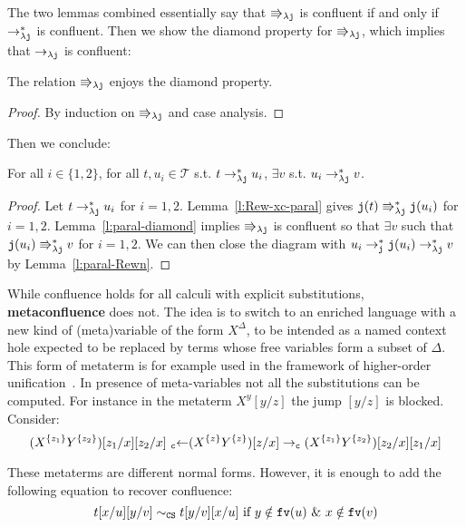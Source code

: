 \documentclass{LMCS}
\renewcommand{\>}{\rightarrow}
\def\lam{\lambda}
\newcommand{\Rew}[1]{\rightarrow_{#1}}
\newcommand{\Rewn}[2][*]{\rightarrow^{#1}_{#2}}
\newcommand{\dis}{{\tt j}}
\newcommand{\ldis}{\lam{\dis}}
\newcommand{\LRew}[1]{\mbox{}_{#1}{\leftarrow} }
\newcommand{\fv}[1]{{\tt fv}(#1)}
\newcommand{\DSubs}{{\tt c}}
\newcommand{\CS}{{\tt CS}}
\newcommand{\set}[1]{ \{ #1 \}}
\newcommand{\paralp}[1]{\Rrightarrow_{#1}}
\newcommand{\paralpn}[1]{\Rrightarrow^{*}_{#1}}
\newcommand{\terms}{\mathcal{T}}
\newcommand{\deft}[1]{{\bf #1}}
\newcommand{\fc}{\dis}
\begin{document}
The two lemmas combined essentially say that $\paralp{\ldis}$ is
confluent if and only if $\Rewn{\ldis}$ is confluent. Then we show the
diamond property for $\paralp{\ldis}$, which implies that
$\Rew{\ldis}$ is confluent:

\begin{lem}
\label{l:paral-diamond}
The relation $\paralp{\ldis}$ enjoys the diamond property.
\end{lem}

\begin{proof}
By induction on $\paralp{\ldis}$ and case analysis.
\end{proof}

Then we conclude:

\begin{thm}[Confluence]
\label{t:confluence}
For all $i\in \set{1,2}$, for all $t, u_i \in \terms$ s.t. $t \Rewn{\ldis} u_i$,
$\exists v$ s.t. $u_i \Rewn{\ldis} v$. 
\end{thm}

\begin{proof}
Let $t \Rewn{\ldis} u_i$ for $i=1,2$. Lemma~\ref{l:Rew-xc-paral}
gives $\fc(t) \paralpn{\ldis} \fc(u_i)$ for $i=1,2$. Lemma~\ref{l:paral-diamond}
implies $\paralp{\ldis}$ is confluent so that $\exists v$ such that
$\fc(u_i) \paralpn{\ldis} v$ for $i=1,2$. We can then close the diagram
with $u_i\Rewn{\dis} \fc(u_i) \Rewn{\ldis} v$ by Lemma~\ref{l:paral-Rewn}.
\end{proof}

While confluence holds for all calculi with explicit substitutions,
\deft{metaconfluence} does not. 
The idea is to
switch to  an enriched language  with a new  kind of (meta)variable  of the
form $X^\Delta$, to  be intended as a named  context hole expected to
be  replaced by  terms whose  free  variables form a subset of $\Delta$. 
This form of metaterm is for example used in  the
framework of higher-order unification~\cite{HuetThEtat}. In
presence  of   meta-variables  not   all  the  substitutions   can  be
computed.  For instance in the metaterm $X^{y}[y/z]$ the jump $[y/z]$  is
blocked.  Consider:
\[ (X^{\set{z_1}} Y^{\set{z_2}})[z_1/x][z_2/x]\  \LRew{\DSubs}
    (X^{\set{z}} Y^{\set{z}})[z/x] \Rew{\DSubs} (X^{\set{z_1}} Y^{\set{z_2}})[z_2/x][z_1/x] \] 

These metaterms are different normal forms. 
However, it is  enough to  add the following equation  to recover
confluence:
\[  t[x/u][y/v] \sim_{\CS} t[y/v][x/u] \mbox{ if } y \notin \fv{u}\ \&\ x \notin \fv{v} \]  
\end{document}
